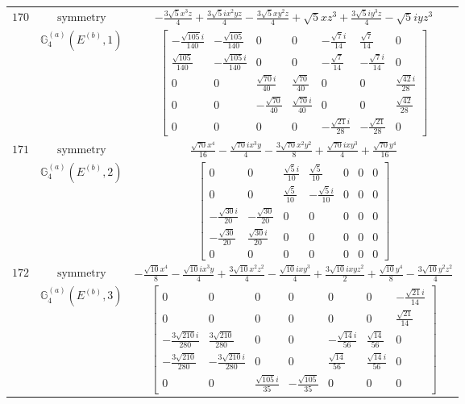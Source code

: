 \documentclass[fleqn,8pt,landscape]{jsarticle}
\begin{document}
\begin{longtable}{ccc}
$ 170 $ & $ \text{symmetry} $ & $ - \frac{3 \sqrt{5} x^{3} z}{4} + \frac{3 \sqrt{5} i x^{2} y z}{4} - \frac{3 \sqrt{5} x y^{2} z}{4} + \sqrt{5} x z^{3} + \frac{3 \sqrt{5} i y^{3} z}{4} - \sqrt{5} i y z^{3} $ \\
$  $ & $ \mathbb{G}_{4}^{(a)}(E^{(b)},1) $ & $ \begin{bmatrix} - \frac{\sqrt{105} i}{140} & - \frac{\sqrt{105}}{140} & 0 & 0 & - \frac{\sqrt{7} i}{14} & \frac{\sqrt{7}}{14} & 0 \\ \frac{\sqrt{105}}{140} & - \frac{\sqrt{105} i}{140} & 0 & 0 & - \frac{\sqrt{7}}{14} & - \frac{\sqrt{7} i}{14} & 0 \\ 0 & 0 & \frac{\sqrt{70} i}{40} & \frac{\sqrt{70}}{40} & 0 & 0 & \frac{\sqrt{42} i}{28} \\ 0 & 0 & - \frac{\sqrt{70}}{40} & \frac{\sqrt{70} i}{40} & 0 & 0 & \frac{\sqrt{42}}{28} \\ 0 & 0 & 0 & 0 & - \frac{\sqrt{21} i}{28} & - \frac{\sqrt{21}}{28} & 0 \end{bmatrix} $ \\ \hline
$ 171 $ & $ \text{symmetry} $ & $ \frac{\sqrt{70} x^{4}}{16} - \frac{\sqrt{70} i x^{3} y}{4} - \frac{3 \sqrt{70} x^{2} y^{2}}{8} + \frac{\sqrt{70} i x y^{3}}{4} + \frac{\sqrt{70} y^{4}}{16} $ \\
$  $ & $ \mathbb{G}_{4}^{(a)}(E^{(b)},2) $ & $ \begin{bmatrix} 0 & 0 & \frac{\sqrt{5} i}{10} & \frac{\sqrt{5}}{10} & 0 & 0 & 0 \\ 0 & 0 & \frac{\sqrt{5}}{10} & - \frac{\sqrt{5} i}{10} & 0 & 0 & 0 \\ - \frac{\sqrt{30} i}{20} & - \frac{\sqrt{30}}{20} & 0 & 0 & 0 & 0 & 0 \\ - \frac{\sqrt{30}}{20} & \frac{\sqrt{30} i}{20} & 0 & 0 & 0 & 0 & 0 \\ 0 & 0 & 0 & 0 & 0 & 0 & 0 \end{bmatrix} $ \\ \hline
$ 172 $ & $ \text{symmetry} $ & $ - \frac{\sqrt{10} x^{4}}{8} - \frac{\sqrt{10} i x^{3} y}{4} + \frac{3 \sqrt{10} x^{2} z^{2}}{4} - \frac{\sqrt{10} i x y^{3}}{4} + \frac{3 \sqrt{10} i x y z^{2}}{2} + \frac{\sqrt{10} y^{4}}{8} - \frac{3 \sqrt{10} y^{2} z^{2}}{4} $ \\
$  $ & $ \mathbb{G}_{4}^{(a)}(E^{(b)},3) $ & $ \begin{bmatrix} 0 & 0 & 0 & 0 & 0 & 0 & - \frac{\sqrt{21} i}{14} \\ 0 & 0 & 0 & 0 & 0 & 0 & \frac{\sqrt{21}}{14} \\ - \frac{3 \sqrt{210} i}{280} & \frac{3 \sqrt{210}}{280} & 0 & 0 & - \frac{\sqrt{14} i}{56} & \frac{\sqrt{14}}{56} & 0 \\ - \frac{3 \sqrt{210}}{280} & - \frac{3 \sqrt{210} i}{280} & 0 & 0 & \frac{\sqrt{14}}{56} & \frac{\sqrt{14} i}{56} & 0 \\ 0 & 0 & \frac{\sqrt{105} i}{35} & - \frac{\sqrt{105}}{35} & 0 & 0 & 0 \end{bmatrix} $ \\ \hline

\end{longtable}
\end{document}
